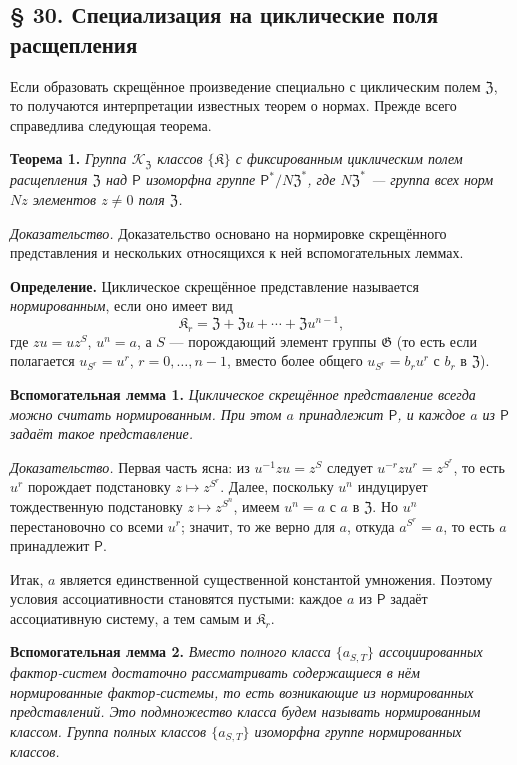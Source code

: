 \documentclass[11pt]{article}
\begin{document}
\subsection*{§ 30. Специализация на циклические поля расщепления}\label{spezialisierung-auf-zyklische-zerfaellungskoerper}

Если образовать скрещённое произведение специально с циклическим полем \(\mathfrak Z\), то получаются интерпретации известных теорем о нормах. Прежде всего справедлива следующая теорема.

\noindent\textbf{Теорема 1.} \emph{Группа \(\mathscr K_{\mathfrak Z}\) классов \(\{\mathfrak K\}\) с фиксированным циклическим полем расщепления \(\mathfrak Z\) над \(\mathsf{P}\) изоморфна группе \(\mathsf{P}^*/N\mathfrak Z^*\), где \(N\mathfrak Z^*\) --- группа всех норм \(Nz\) элементов \(z\neq0\) поля \(\mathfrak Z\).}

\noindent\emph{Доказательство.} Доказательство основано на нормировке скрещённого представления и нескольких относящихся к ней вспомогательных леммах.

\noindent\textbf{Определение.} Циклическое скрещённое представление называется \emph{нормированным}, если оно имеет вид
\[
\mathfrak K_r=\mathfrak Z+\mathfrak Zu+\cdots+\mathfrak Zu^{n-1},
\]
где \(zu=uz^S\), \(u^n=a\), а \(S\) --- порождающий элемент группы \(\mathfrak G\) (то есть если полагается \(u_{S^r}=u^r\), \(r=0,\ldots,n-1\), вместо более общего \(u_{S^r}=b_ru^r\) с \(b_r\) в \(\mathfrak Z\)).

\noindent\textbf{Вспомогательная лемма 1.} \emph{Циклическое скрещённое представление всегда можно считать нормированным. При этом \(a\) принадлежит \(\mathsf{P}\), и каждое \(a\) из \(\mathsf{P}\) задаёт такое представление.}

\noindent\emph{Доказательство.} Первая часть ясна: из \(u^{-1}zu=z^S\) следует \(u^{-r}zu^r=z^{S^r}\), то есть \(u^r\) порождает подстановку \(z\mapsto z^{S^r}\). Далее, поскольку \(u^n\) индуцирует тождественную подстановку \(z\mapsto z^{S^n}\), имеем \(u^n=a\) с \(a\) в \(\mathfrak Z\). Но \(u^n\) перестановочно со всеми \(u^r\); значит, то же верно для \(a\), откуда \(a^{S^r}=a\), то есть \(a\) принадлежит \(\mathsf{P}\).

Итак, \(a\) является единственной существенной константой умножения. Поэтому условия ассоциативности становятся пустыми: каждое \(a\) из \(\mathsf{P}\) задаёт ассоциативную систему, а тем самым и \(\mathfrak K_r\).

\noindent\textbf{Вспомогательная лемма 2.} \emph{Вместо полного класса \(\{a_{S,T}\}\) ассоциированных фактор-систем достаточно рассматривать содержащиеся в нём нормированные фактор-системы, то есть возникающие из нормированных представлений. Это подмножество класса будем называть нормированным классом. Группа полных классов \(\{a_{S,T}\}\) изоморфна группе нормированных классов.}
\end{document}
